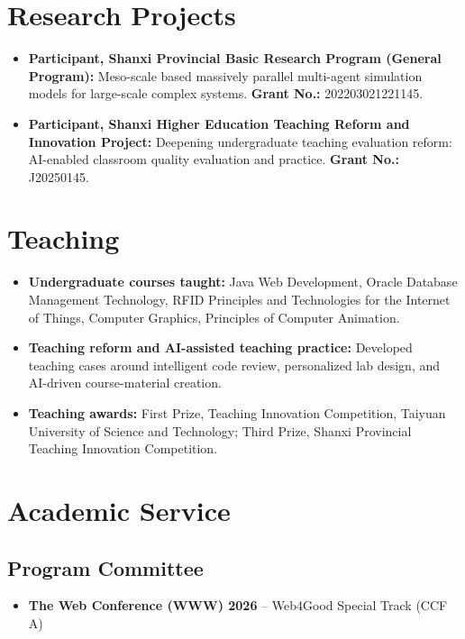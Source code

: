 \documentclass[a4paper,10pt]{article}
\newcommand{\cvlabel}[1]{\textbf{#1}}
\begin{document}
\section*{Research Projects}
\begin{itemize}
  \item \cvlabel{Participant, Shanxi Provincial Basic Research Program (General Program):} Meso-scale based massively parallel multi-agent simulation models for large-scale complex systems. \cvlabel{Grant No.:} 202203021221145.
  \item \cvlabel{Participant, Shanxi Higher Education Teaching Reform and Innovation Project:} Deepening undergraduate teaching evaluation reform: AI-enabled classroom quality evaluation and practice. \cvlabel{Grant No.:} J20250145.
\end{itemize}

\section*{Teaching}
\begin{itemize}
  \item \cvlabel{Undergraduate courses taught:} Java Web Development, Oracle Database Management Technology, RFID Principles and Technologies for the Internet of Things, Computer Graphics, Principles of Computer Animation.
  \item \cvlabel{Teaching reform and AI-assisted teaching practice:} Developed teaching cases around intelligent code review, personalized lab design, and AI-driven course-material creation.
  \item \cvlabel{Teaching awards:} First Prize, Teaching Innovation Competition, Taiyuan University of Science and Technology; Third Prize, Shanxi Provincial Teaching Innovation Competition.
\end{itemize}

\section*{Academic Service}
\subsection*{Program Committee}
\begin{itemize}
  \item \textbf{The Web Conference (WWW) 2026} -- Web4Good Special Track (CCF A)
\end{itemize}
\end{document}
